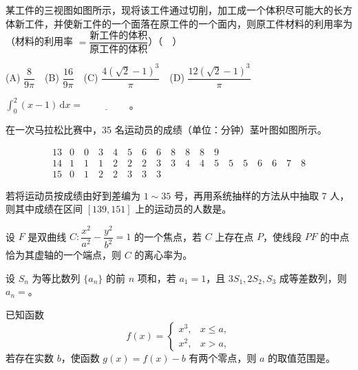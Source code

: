 \begin{question}

某工件的三视图如图所示，现将该工件通过切削，加工成一个体积尽可能大的长方体新工件，并使新工件的一个面落在原工件的一个面内，则原工件材料的利用率为（材料的利用率 \(=\dfrac{\text{新工件的体积}}{\text{原工件的体积}}\)）（　）
\nopagebreak[4]
\begin{center}\end{center}
\nopagebreak[4]
(A) \(\dfrac{8}{9\pi}\)　(B) \(\dfrac{16}{9\pi}\)　(C) \(\dfrac{4(\sqrt2-1)^3}{\pi}\)　(D) \(\dfrac{12(\sqrt2-1)^3}{\pi}\)

\end{question}

\begin{question}

\(\displaystyle\int_0^2(x-1)\,\mathrm dx=\underline{\hspace{2cm}}\)。

\end{question}
\begin{question}

在一次马拉松比赛中，35 名运动员的成绩（单位：分钟）茎叶图如图所示。

\nopagebreak[4]
\[
\begin{array}{c|l}
13 & 0\quad0\quad3\quad4\quad5\quad6\quad6\quad8\quad8\quad8\quad9\\
14 & 1\quad1\quad1\quad2\quad2\quad2\quad3\quad3\quad4\quad4\quad5\quad5\quad5\quad6\quad6\quad7\quad8\\
15 & 0\quad1\quad2\quad2\quad3\quad3\quad3
\end{array}
\]

若将运动员按成绩由好到差编为 \(1\sim35\) 号，再用系统抽样的方法从中抽取 7 人，则其中成绩在区间 \([139,151]\) 上的运动员的人数是\gkblank{}。

\end{question}
\begin{question}

设 \(F\) 是双曲线 \(C:\dfrac{x^2}{a^2}-\dfrac{y^2}{b^2}=1\) 的一个焦点，若 \(C\) 上存在点 \(P\)，使线段 \(PF\) 的中点恰为其虚轴的一个端点，则 \(C\) 的离心率为\gkblank{}。

\end{question}
\begin{question}

设 \(S_n\) 为等比数列 \(\{a_n\}\) 的前 \(n\) 项和，若 \(a_1=1\)，且 \(3S_1,2S_2,S_3\) 成等差数列，则 \(a_n=\)\gkblank{}。

\end{question}
\begin{question}

已知函数
\nopagebreak[4]
\[
f(x)=\begin{cases}
x^3,&x\leqslant a,\\
x^2,&x>a,
\end{cases}
\]
若存在实数 \(b\)，使函数 \(g(x)=f(x)-b\) 有两个零点，则 \(a\) 的取值范围是\gkblank{}。

\end{question}

